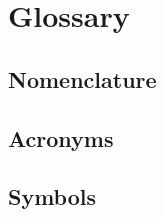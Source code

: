 \chapter{Glossary}\label{glossary}

\renewcommand{\glossarysection}[2][]{}
\renewcommand{\glsnamefont}[1]{\chapterfont\small\textbf{#1}}
\glsnoexpandfields  %


\section*{Nomenclature}\label{equipment}
\vspace{-30pt}
\glsaddall[types={nomenclature}]
\printglossary[type=nomenclature]


\section*{Acronyms}\label{acronyms}
\vspace{-30pt}
\glsaddall
\printglossary[type=\acronymtype]


\section*{Symbols}\label{symbols}
\vspace{-30pt}
\glsaddall
\printglossary[type=symbols]


\newpage